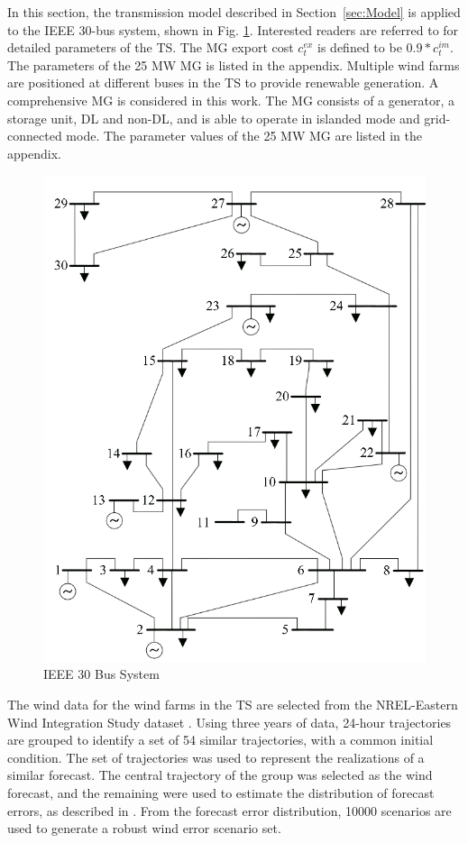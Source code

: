 In this section, the transmission model described in Section~\ref{sec:Model} is applied to the IEEE 30-bus system, shown in Fig.
\ref{fig:wee}. Interested readers are referred to \cite{zimmerman2009matpower} for
detailed parameters of the TS. The MG export cost $c^{ex}_{t}$ is defined to be $0.9*c^{im}_{t}$. The parameters of the 25 MW MG is listed in the appendix.  Multiple wind farms are positioned at different buses in the TS to provide renewable generation. A comprehensive MG is considered in this work. The MG consists of a
generator, a storage unit, DL and non-DL, and is able
to operate in islanded mode and grid-connected mode. The parameter values of the 25 MW MG are listed in the appendix.
\begin{figure}[H]
\centering
\includegraphics[scale=0.4]{IEEE_30bus.png}
\caption{IEEE 30 Bus System}
\label{fig:wee}
\end{figure}

The wind data for the wind farms in the TS are selected from the
NREL-Eastern Wind Integration Study dataset \cite{energy2010eastern}.
Using three years of data, 24-hour trajectories are grouped
to identify a set of 54 similar trajectories, with a common initial
condition. The set of trajectories was used
to represent the realizations of a similar forecast. The central
trajectory of the group was selected as the wind forecast,
and the remaining were used to estimate the distribution of
forecast errors, as described in \cite{anderson2011wind}. From the forecast error
distribution, 10000 scenarios are used to generate a robust
wind error scenario set. 

